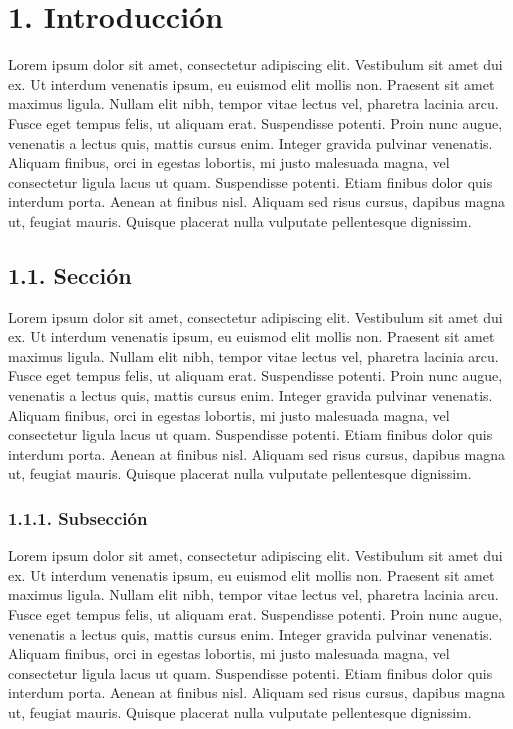 \documentclass[a4paper,openright,12pt]{report}
\begin{document}
\tableofcontents

\chapter*{1. Introducción}\label{c_introduccion} 

Lorem ipsum dolor sit amet, consectetur adipiscing elit. Vestibulum sit amet dui ex. Ut interdum venenatis ipsum, eu euismod elit mollis non. Praesent sit amet maximus ligula. Nullam elit nibh, tempor vitae lectus vel, pharetra lacinia arcu. Fusce eget tempus felis, ut aliquam erat. Suspendisse potenti. Proin nunc augue, venenatis a lectus quis, mattis cursus enim. Integer gravida pulvinar venenatis. Aliquam finibus, orci in egestas lobortis, mi justo malesuada magna, vel consectetur ligula lacus ut quam. Suspendisse potenti. Etiam finibus dolor quis interdum porta. Aenean at finibus nisl. Aliquam sed risus cursus, dapibus magna ut, feugiat mauris. Quisque placerat nulla vulputate pellentesque dignissim.

\section*{1.1. Sección}

Lorem ipsum dolor sit amet, consectetur adipiscing elit. Vestibulum sit amet dui ex. Ut interdum venenatis ipsum, eu euismod elit mollis non. Praesent sit amet maximus ligula. Nullam elit nibh, tempor vitae lectus vel, pharetra lacinia arcu. Fusce eget tempus felis, ut aliquam erat. Suspendisse potenti. Proin nunc augue, venenatis a lectus quis, mattis cursus enim. Integer gravida pulvinar venenatis. Aliquam finibus, orci in egestas lobortis, mi justo malesuada magna, vel consectetur ligula lacus ut quam. Suspendisse potenti. Etiam finibus dolor quis interdum porta. Aenean at finibus nisl. Aliquam sed risus cursus, dapibus magna ut, feugiat mauris. Quisque placerat nulla vulputate pellentesque dignissim. 

\subsection*{1.1.1. Subsección}

Lorem ipsum dolor sit amet, consectetur adipiscing elit. Vestibulum sit amet dui ex. Ut interdum venenatis ipsum, eu euismod elit mollis non. Praesent sit amet maximus ligula. Nullam elit nibh, tempor vitae lectus vel, pharetra lacinia arcu. Fusce eget tempus felis, ut aliquam erat. Suspendisse potenti. Proin nunc augue, venenatis a lectus quis, mattis cursus enim. Integer gravida pulvinar venenatis. Aliquam finibus, orci in egestas lobortis, mi justo malesuada magna, vel consectetur ligula lacus ut quam. Suspendisse potenti. Etiam finibus dolor quis interdum porta. Aenean at finibus nisl. Aliquam sed risus cursus, dapibus magna ut, feugiat mauris. Quisque placerat nulla vulputate pellentesque dignissim.
\end{document}

